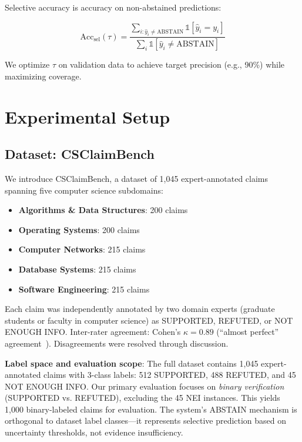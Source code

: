 \documentclass[journal]{IEEEtran}
\begin{document}
Selective accuracy is accuracy on non-abstained predictions:

\begin{equation}
\text{Acc}_{\text{sel}}(\tau) = \frac{\sum_{i: \hat{y}_i \neq \text{ABSTAIN}} \mathbb{1}[\hat{y}_i = y_i]}{\sum_{i} \mathbb{1}[\hat{y}_i \neq \text{ABSTAIN}]}
\end{equation}

We optimize $\tau$ on validation data to achieve target precision (e.g., 90\%) while maximizing coverage.


\section{Experimental Setup}

\subsection{Dataset: CSClaimBench}

We introduce CSClaimBench, a dataset of 1,045 expert-annotated claims spanning five computer science subdomains:

\begin{itemize}
    \item \textbf{Algorithms \& Data Structures}: 200 claims
    \item \textbf{Operating Systems}: 200 claims
    \item \textbf{Computer Networks}: 215 claims
    \item \textbf{Database Systems}: 215 claims
    \item \textbf{Software Engineering}: 215 claims
\end{itemize}

Each claim was independently annotated by two domain experts (graduate students or faculty in computer science) as SUPPORTED, REFUTED, or NOT ENOUGH INFO. Inter-rater agreement: Cohen's $\kappa = 0.89$ (``almost perfect'' agreement~\cite{Landis1977}). Disagreements were resolved through discussion.

\textbf{Label space and evaluation scope}: The full dataset contains 1,045 expert-annotated claims with 3-class labels: 512 SUPPORTED, 488 REFUTED, and 45 NOT ENOUGH INFO. Our primary evaluation focuses on \textit{binary verification} (SUPPORTED vs. REFUTED), excluding the 45 NEI instances. This yields 1,000 binary-labeled claims for evaluation. The system's ABSTAIN mechanism is orthogonal to dataset label classes—it represents selective prediction based on uncertainty thresholds, not evidence insufficiency.
\end{document}
